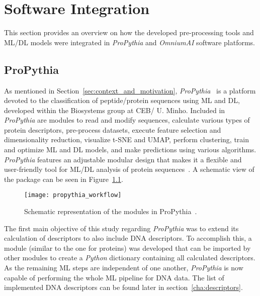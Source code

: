 \chapter{Software Integration}\label{chap:integration}

This section provides an overview on how the developed pre-processing tools and \gls{ML}/\gls{DL} models were integrated in \textit{ProPythia} and \textit{OmniumAI} software platforms.

\section{ProPythia}

As mentioned in Section~\ref{sec:context_and_motivation}, \textit{ProPythia}~\cite{Sequeira2020ProPythia:Learning} is a platform devoted to the classification of peptide/protein sequences using \gls{ML} and \gls{DL}, developed within the Biosystems group at CEB/ U. Minho. Included in \textit{ProPythia} are modules to read and modify sequences, calculate various types of protein descriptors, pre-process datasets, execute feature selection and dimensionality reduction, visualize t-SNE and UMAP, perform clustering, train and optimize \gls{ML} and \gls{DL} models, and make predictions using various algorithms. \textit{ProPythia} features an adjustable modular design that makes it a flexible and user-friendly tool for \gls{ML}/\gls{DL} analysis of protein sequences~\cite{Sequeira2020ProPythia:Learning}. A schematic view
of the package can be seen in Figure~\ref{fig:propythia_workflow}.

\begin{figure}[htbp]
    \centering
    \texttt{[image: propythia\_workflow]}
    \caption{Schematic representation of the modules in ProPythia~\cite{Sequeira2020ProPythia:Learning}.}
    \label{fig:propythia_workflow}
\end{figure}

The first main objective of this study regarding \textit{ProPythia} was to extend its calculation of descriptors to also include \gls{DNA} descriptors. To accomplish this, a module (similar to the one for proteins) was developed that can be imported by other modules to create a \textit{Python} dictionary containing all calculated descriptors. As the remaining \gls{ML} steps are independent of one another, \textit{ProPythia} is now capable of performing the whole \gls{ML} pipeline for \gls{DNA} data. The list of implemented \gls{DNA} descriptors can be found later in section~\ref{cha:descriptors}.

